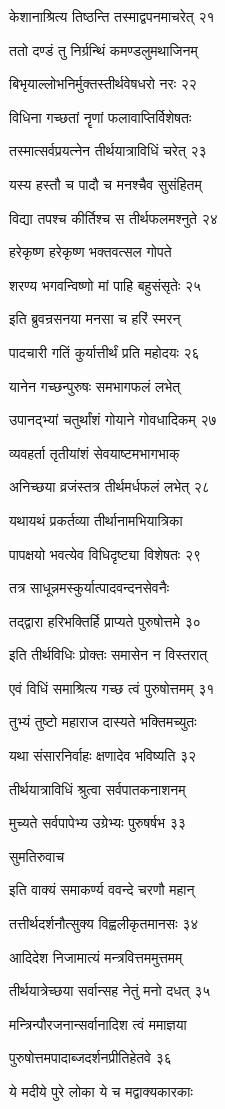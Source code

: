 केशानाश्रित्य तिष्ठन्ति तस्माद्वपनमाचरेत् २१

ततो दण्डं तु निर्ग्रन्थिं कमण्डलुमथाजिनम्

बिभृयाल्लोभनिर्मुक्तस्तीर्थवेषधरो नरः २२

विधिना गच्छतां नॄणां फलावाप्तिर्विशेषतः

तस्मात्सर्वप्रयत्नेन तीर्थयात्राविधिं चरेत् २३

यस्य हस्तौ च पादौ च मनश्चैव सुसंहितम्

विद्या तपश्च कीर्तिश्च स तीर्थफलमश्नुते २४

हरेकृष्ण हरेकृष्ण भक्तवत्सल गोपते

शरण्य भगवन्विष्णो मां पाहि बहुसंसृतेः २५

इति ब्रुवन्रसनया मनसा च हरिं स्मरन्

पादचारी गतिं कुर्यात्तीर्थं प्रति महोदयः २६

यानेन गच्छन्पुरुषः समभागफलं लभेत्

उपानद्भ्यां चतुर्थांशं गोयाने गोवधादिकम् २७

व्यवहर्ता तृतीयांशं सेवयाष्टमभागभाक्

अनिच्छया व्रजंस्तत्र तीर्थमर्धफलं लभेत् २८

यथायथं प्रकर्तव्या तीर्थानामभियात्रिका

पापक्षयो भवत्येव विधिदृष्ट्या विशेषतः २९

तत्र साधून्नमस्कुर्यात्पादवन्दनसेवनैः

तद्द्वारा हरिभक्तिर्हि प्राप्यते पुरुषोत्तमे ३०

इति तीर्थविधिः प्रोक्तः समासेन न विस्तरात्

एवं विधिं समाश्रित्य गच्छ त्वं पुरुषोत्तमम् ३१

तुभ्यं तुष्टो महाराज दास्यते भक्तिमच्युतः

यथा संसारनिर्वाहः क्षणादेव भविष्यति ३२

तीर्थयात्राविधिं श्रुत्वा सर्वपातकनाशनम्

मुच्यते सर्वपापेभ्य उग्रेभ्यः पुरुषर्षभ ३३

सुमतिरुवाच

इति वाक्यं समाकर्ण्य ववन्दे चरणौ महान्

तत्तीर्थदर्शनौत्सुक्य विह्वलीकृतमानसः ३४

आदिदेश निजामात्यं मन्त्रवित्तममुत्तमम्

तीर्थयात्रेच्छया सर्वान्सह नेतुं मनो दधत् ३५

मन्त्रिन्पौरजनान्सर्वानादिश त्वं ममाज्ञया

पुरुषोत्तमपादाब्जदर्शनप्रीतिहेतवे ३६

ये मदीये पुरे लोका ये च मद्वाक्यकारकाः

